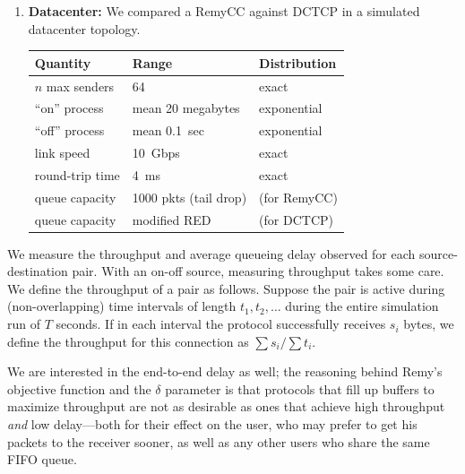 \begin{enumerate}
\item {\bf Datacenter:} We compared a RemyCC against
  DCTCP in a simulated datacenter topology.

\begin{tabular}{lll}
\bf Quantity & \bf Range & \bf Distribution \\
\hline $n$ max senders & 64 & exact \\
``on'' process & mean 20 megabytes & exponential \\
``off'' process & mean 0.1~sec & exponential \\
link speed & 10~Gbps & exact \\
round-trip time & 4~ms & exact \\
queue capacity & 1000 pkts (tail drop) & (for RemyCC) \\
queue capacity & modified RED & (for DCTCP) \\
\end{tabular}

\end{enumerate}



\medskip
{}  We measure the throughput and average
queueing delay observed for each source-destination pair. With an
on-off source, measuring throughput takes some care.  We define the
throughput of a pair as follows. Suppose the pair is active during
(non-overlapping) time intervals of length $t_1, t_2, \ldots$ during
the entire simulation run of $T$ seconds. If in each interval the
protocol successfully receives $s_i$ bytes, we define the throughput
for this connection as $\sum s_i / \sum t_i$.%

We are interested in the end-to-end delay as well; the reasoning
behind Remy's objective function and the $\delta$ parameter is that
protocols that fill up buffers to maximize throughput are not as
desirable as ones that achieve high throughput \emph{and} low
delay---both for their effect on the user, who may prefer to get his
packets to the receiver sooner, as well as any other users who share
the same FIFO queue.

